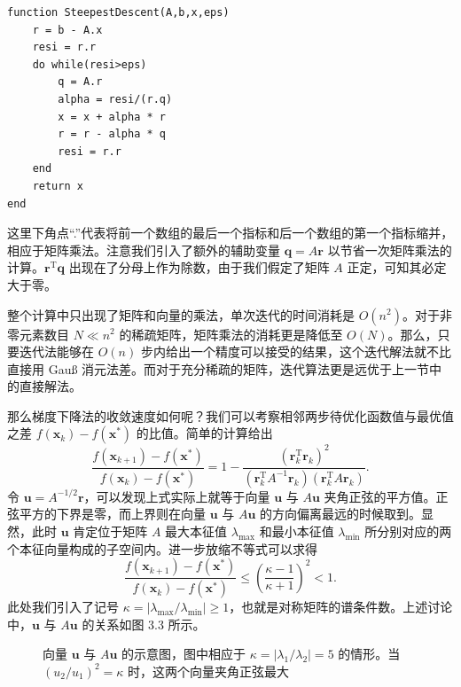 \begin{algorithmBox}
\begin{lstlisting}[style=bellacode]
function SteepestDescent(A,b,x,eps)
    r = b - A.x
    resi = r.r
    do while(resi>eps)
        q = A.r
        alpha = resi/(r.q)
        x = x + alpha * r
        r = r - alpha * q
        resi = r.r
    end
    return x
end
\end{lstlisting}
\end{algorithmBox}

这里下角点“.”代表将前一个数组的最后一个指标和后一个数组的第一个指标缩并，相应于矩阵乘法。注意我们引入了额外的辅助变量 $\bm q=A\bm r$ 以节省一次矩阵乘法的计算。$\bm r^{\mathrm T}\bm q$ 出现在了分母上作为除数，由于我们假定了矩阵 $A$ 正定，可知其必定大于零。

整个计算中只出现了矩阵和向量的乘法，单次迭代的时间消耗是 $O(n^2)$。对于非零元素数目 $N\ll n^2$ 的稀疏矩阵，矩阵乘法的消耗更是降低至 $O(N)$。那么，只要迭代法能够在 $O(n)$ 步内给出一个精度可以接受的结果，这个迭代解法就不比直接用 Gauß 消元法差。而对于充分稀疏的矩阵，迭代算法更是远优于上一节中的直接解法。

那么梯度下降法的收敛速度如何呢？我们可以考察相邻两步待优化函数值与最优值之差 $f(\bm x_k)-f(\bm x^*)$ 的比值。简单的计算给出
\begin{equation}
\frac{f(\bm x_{k+1})-f(\bm x^*)}{f(\bm x_k)-f(\bm x^*)}
=1-\frac{(\bm r_k^{\mathrm T}\bm r_k)^2}{(\bm r_k^{\mathrm T}A^{-1}\bm r_k)(\bm r_k^{\mathrm T}A\bm r_k)}.
\tag{3.2.20}
\end{equation}
令 $\bm u=A^{-1/2}\bm r$，可以发现上式实际上就等于向量 $\bm u$ 与 $A\bm u$ 夹角正弦的平方值。正弦平方的下界是零，而上界则在向量 $\bm u$ 与 $A\bm u$ 的方向偏离最远的时候取到。显然，此时 $\bm u$ 肯定位于矩阵 $A$ 最大本征值 $\lambda_{\max}$ 和最小本征值 $\lambda_{\min}$ 所分别对应的两个本征向量构成的子空间内。进一步放缩不等式可以求得
\begin{equation}
\frac{f(\bm x_{k+1})-f(\bm x^*)}{f(\bm x_k)-f(\bm x^*)}
\le\left(\frac{\kappa-1}{\kappa+1}\right)^2<1.
\tag{3.2.21}
\end{equation}
此处我们引入了记号 $\kappa=|\lambda_{\max}/\lambda_{\min}|\ge1$，也就是对称矩阵的谱条件数。上述讨论中，$\bm u$ 与 $A\bm u$ 的关系如图 3.3 所示。

\begin{figure}[htbp]
\centering
{}
\caption{向量 $\bm u$ 与 $A\bm u$ 的示意图，图中相应于 $\kappa=|\lambda_1/\lambda_2|=5$ 的情形。当 $(u_2/u_1)^2=\kappa$ 时，这两个向量夹角正弦最大}
\label{fig:u-Au}
\end{figure}

